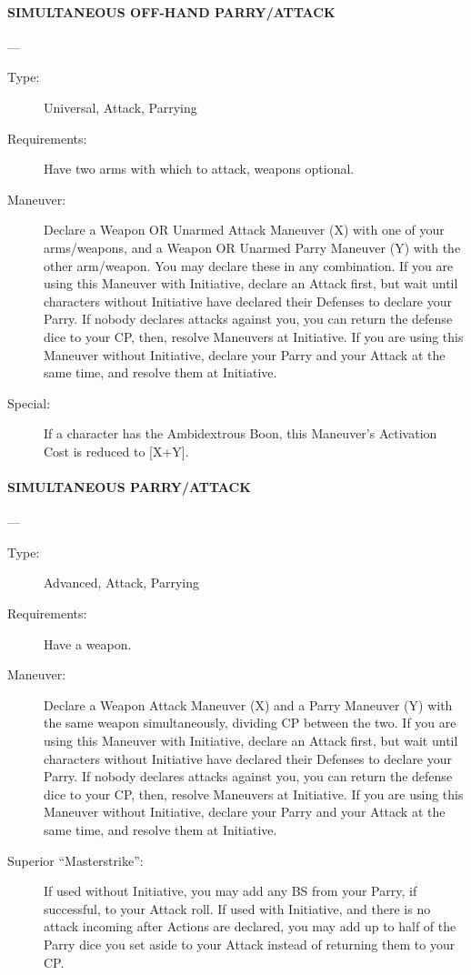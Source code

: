 \documentclass[oneside,11pt,english]{book}
\begin{document}
\paragraph{\large\label{man:SIMULTANEOUS OFF-HAND PARRY/ATTACK} SIMULTANEOUS OFF-HAND PARRY/ATTACK}---\quad{\large[X+Y+2]}
\vspace{-10pt}\begin{description} 
\item [Type:] Universal, Attack, Parrying 
\item [Requirements:] Have two arms with which to attack, weapons optional. 
\item [Maneuver:] Declare a Weapon OR Unarmed Attack Maneuver (X) with one of your arms/weapons, and a 
Weapon OR Unarmed Parry Maneuver (Y) with the other arm/weapon. You may declare these in any 
combination. 
If you are using this Maneuver with Initiative, declare an Attack first, but wait until characters without 
Initiative have declared their Defenses to declare your Parry. If nobody declares attacks against you, you 
can return the defense dice to your CP, then, resolve Maneuvers at Initiative. 
If you are using this Maneuver without Initiative, declare your Parry and your Attack at the same time, 
and resolve them at Initiative. 
\item [Special:] If a character has the Ambidextrous Boon, this Maneuver’s Activation Cost is reduced to [X+Y]. 
\end{description}
\paragraph{\large\label{man:SIMULTANEOUS PARRY/ATTACK} SIMULTANEOUS PARRY/ATTACK}---\quad{\large[X+Y+2]}
\vspace{-10pt}\begin{description} 
\item [Type:] Advanced, Attack, Parrying 
\item [Requirements:] Have a weapon. 
\item [Maneuver:] Declare a Weapon Attack Maneuver (X) and a Parry Maneuver (Y) with the same weapon 
simultaneously, dividing CP between the two. 
If you are using this Maneuver with Initiative, declare an Attack first, but wait until characters without 
Initiative have declared their Defenses to declare your Parry. If nobody declares attacks against you, you 
can return the defense dice to your CP, then, resolve Maneuvers at Initiative. 
If you are using this Maneuver without Initiative, declare your Parry and your Attack at the same time, 
and resolve them at Initiative. 
\item [Superior “Masterstrike”:] If used without Initiative, you may add any BS from your Parry, if successful, 
to your Attack roll. If used with Initiative, and there is no attack incoming after Actions are declared, you 
may add up to half of the Parry dice you set aside to your Attack instead of returning them to your CP. 
\end{description}
\end{document}
